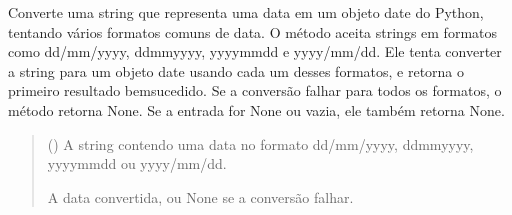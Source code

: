 \documentclass[letterpaper,10pt,english]{sphinxmanual}
\begin{document}
\begin{fulllineitems}
\label{\detokenize{api/formatters:formatters.parse_date_any}}
\pysigstartsignatures
\pysiglinewithargsret
{}
{}
{}
\pysigstopsignatures
\sphinxAtStartPar
Converte uma string que representa uma data em um objeto date do Python, tentando vários formatos comuns de data. O método aceita strings em formatos como dd/mm/yyyy, dd\sphinxhyphen{}mm\sphinxhyphen{}yyyy, yyyy\sphinxhyphen{}mm\sphinxhyphen{}dd e yyyy/mm/dd. Ele tenta converter a string para um objeto date usando cada um desses formatos, e retorna o primeiro resultado bem\sphinxhyphen{}sucedido. Se a conversão falhar para todos os formatos, o método retorna None. Se a entrada for None ou vazia, ele também retorna None.
\begin{quote}\begin{description}
\sphinxAtStartPar
{} () \textendash{} A string contendo uma data no formato dd/mm/yyyy, dd\sphinxhyphen{}mm\sphinxhyphen{}yyyy, yyyy\sphinxhyphen{}mm\sphinxhyphen{}dd ou yyyy/mm/dd.

\sphinxAtStartPar
A data convertida, ou None se a conversão falhar.

\sphinxAtStartPar
{}

\end{description}\end{quote}

\end{fulllineitems}

\end{document}
